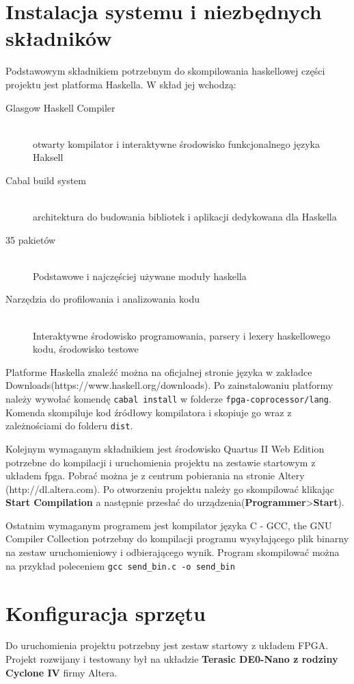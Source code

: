 \section{Instalacja systemu i niezbędnych składników}
Podstawowym składnikiem potrzebnym do skompilowania haskellowej części projektu jest platforma Haskella. W skład jej wchodzą:
\begin{description}
  \item[Glasgow Haskell Compiler] \hfill \\
  otwarty kompilator i interaktywne środowisko funkcjonalnego języka Haksell 
  \item[Cabal build system] \hfill \\
  architektura do budowania bibliotek i aplikacji dedykowana dla Haskella
  \item[35 pakietów] \hfill \\
  Podstawowe i najczęściej używane moduły haskella
  \item[Narzędzia do profilowania i analizowania kodu] \hfill \\
  Interaktywne środowisko programowania, parsery i lexery haskellowego kodu, środowisko testowe
\end{description}

Platforme Haskella znaleźć można na oficjalnej stronie języka w zakładce Downloads(https://www.haskell.org/downloads).
Po zainstalowaniu platformy należy wywołać komendę \texttt{cabal install} w folderze \texttt{fpga-coprocessor/lang}. Komenda skompiluje kod źródłowy kompilatora i skopiuje go wraz z zależnościami do folderu \texttt{dist}.

Kolejnym wymaganym składnikiem jest środowisko Quartus II Web Edition potrzebne do kompilacji i uruchomienia projektu na zestawie startowym z układem fpga. Pobrać można je z centrum pobierania na stronie Altery (http://dl.altera.com).
Po otworzeniu projektu należy go skompilować klikając \textbf{Start Compilation} a następnie przesłać do urządzenia(\textbf{Programmer}\textgreater \textbf{Start}).

Ostatnim wymaganym programem jest kompilator języka C - GCC, the GNU Compiler Collection potrzebny do kompilacji programu wysyłającego plik binarny na zestaw uruchomieniowy i odbierającego wynik. Program skompilować można na przykład poleceniem 
\texttt{gcc send\_bin.c -o send\_bin}
\clearpage
\section{Konfiguracja sprzętu}
Do uruchomienia projektu potrzebny jest zestaw startowy z układem FPGA. Projekt rozwijany i testowany był na układzie \textbf{Terasic DE0-Nano z rodziny Cyclone IV} firmy Altera.

